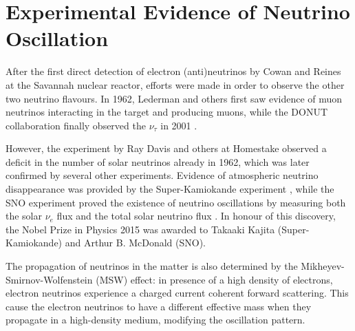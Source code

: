 \section{Experimental Evidence of Neutrino Oscillation}
After the first direct detection of electron (anti)neutrinos by Cowan and Reines at the Savannah nuclear reactor, efforts were made in order to observe the other two neutrino flavours.
In 1962, Lederman and others \cite{PhysRevLett.9.36} first saw evidence of muon neutrinos interacting in the target and producing muons, while the DONUT collaboration finally observed the $\nu_{\tau}$ in 2001 \cite{Kodama:2000mp}.

However, the experiment by Ray Davis and others at Homestake observed a deficit in the number of solar neutrinos already in 1962, which was later confirmed by several other experiments. Evidence of atmospheric neutrino disappearance was provided by the Super-Kamiokande experiment \cite{Fukuda:1998mi}, while the SNO experiment proved the existence of neutrino oscillations by measuring both the solar $\nu_{e}$ flux and the total solar neutrino flux \cite{Ahmad:2002jz}. In honour of this discovery, the Nobel Prize in Physics 2015 was awarded to Takaaki Kajita (Super-Kamiokande) and Arthur B. McDonald (SNO). 

The propagation of neutrinos in the matter is also determined by the Mikheyev-Smirnov-Wolfenstein (MSW) effect: in presence of a high density of electrons, electron neutrinos experience a charged current coherent forward scattering. This cause the electron neutrinos to have a different effective mass when they propagate in a high-density medium, modifying the oscillation pattern. 

